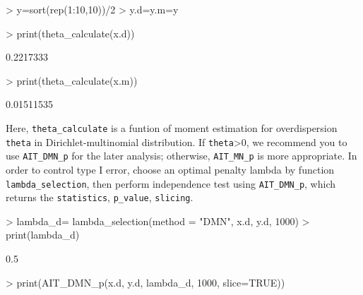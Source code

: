 \documentclass[a4paper,11pt]{article}
\newcommand{\Rcode}[1]{{\texttt{#1}}}
\begin{document}
\begin{Schunk}
\begin{Sinput}
> y=sort(rep(1:10,10))/2
> y.d=y.m=y
\end{Sinput}
\end{Schunk}

\begin{Schunk}
\begin{Sinput}
> print(theta_calculate(x.d))
\end{Sinput}
\begin{Soutput}
[1] 0.2217333
\end{Soutput}
\begin{Sinput}
> print(theta_calculate(x.m))
\end{Sinput}
\begin{Soutput}
[1] 0.01511535
\end{Soutput}
\end{Schunk}

Here, \Rcode{theta\_calculate} is a funtion of moment estimation for overdispersion \Rcode{theta} in Dirichlet-multinomial distribution. If \Rcode{theta}>0, we recommend you to use \Rcode{AIT\_DMN\_p} for the later analysis; otherwise, \Rcode{AIT\_MN\_p} is more appropriate. In order to control type I error, choose an optimal penalty lambda by function \Rcode{lambda\_selection}, then perform independence test using \Rcode{AIT\_DMN\_p}, which returns the \Rcode{statistics}, \Rcode{p\_value}, \Rcode{slicing}.


\begin{Schunk}
\begin{Sinput}
> lambda_d= lambda_selection(method = "DMN", x.d, y.d, 1000)
> print(lambda_d)
\end{Sinput}
\begin{Soutput}
[1] 0.5
\end{Soutput}
\begin{Sinput}
> print(AIT_DMN_p(x.d, y.d, lambda_d, 1000, slice=TRUE))
\end{Sinput}
\end{Schunk}
\end{document}
